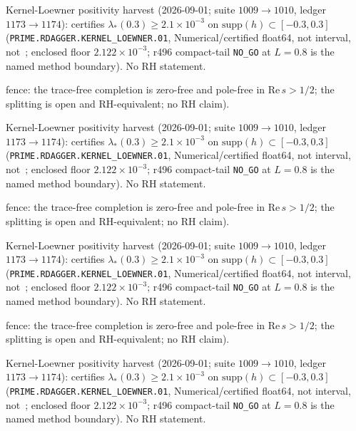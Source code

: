 
Kernel-Loewner positivity harvest (2026-09-01; suite $1009\to1010$, ledger $1173\to1174$):
certifies $\lambda_*(0.3)\ge 2.1{\times}10^{-3}$ on $\mathrm{supp}(h)\subset[-0.3,0.3]$
(\texttt{PRIME.RDAGGER.KERNEL\_LOEWNER.01}, Numerical/certified float64, not interval, not~\mE; enclosed floor $2.122{\times}10^{-3}$;
r496 compact-tail \texttt{NO\_GO} at $L=0.8$ is the named method boundary).  No RH statement.


fence: the trace-free completion is zero-free and pole-free in $\mathrm{Re}\,s>1/2$; the splitting is open and RH-equivalent; no RH claim).

Kernel-Loewner positivity harvest (2026-09-01; suite $1009\to1010$, ledger $1173\to1174$):
certifies $\lambda_*(0.3)\ge 2.1{\times}10^{-3}$ on $\mathrm{supp}(h)\subset[-0.3,0.3]$
(\texttt{PRIME.RDAGGER.KERNEL\_LOEWNER.01}, Numerical/certified float64, not interval, not~\mE; enclosed floor $2.122{\times}10^{-3}$;
r496 compact-tail \texttt{NO\_GO} at $L=0.8$ is the named method boundary).  No RH statement.


fence: the trace-free completion is zero-free and pole-free in $\mathrm{Re}\,s>1/2$; the splitting is open and RH-equivalent; no RH claim).

Kernel-Loewner positivity harvest (2026-09-01; suite $1009\to1010$, ledger $1173\to1174$):
certifies $\lambda_*(0.3)\ge 2.1{\times}10^{-3}$ on $\mathrm{supp}(h)\subset[-0.3,0.3]$
(\texttt{PRIME.RDAGGER.KERNEL\_LOEWNER.01}, Numerical/certified float64, not interval, not~\mE; enclosed floor $2.122{\times}10^{-3}$;
r496 compact-tail \texttt{NO\_GO} at $L=0.8$ is the named method boundary).  No RH statement.


fence: the trace-free completion is zero-free and pole-free in $\mathrm{Re}\,s>1/2$; the splitting is open and RH-equivalent; no RH claim).

Kernel-Loewner positivity harvest (2026-09-01; suite $1009\to1010$, ledger $1173\to1174$):
certifies $\lambda_*(0.3)\ge 2.1{\times}10^{-3}$ on $\mathrm{supp}(h)\subset[-0.3,0.3]$
(\texttt{PRIME.RDAGGER.KERNEL\_LOEWNER.01}, Numerical/certified float64, not interval, not~\mE; enclosed floor $2.122{\times}10^{-3}$;
r496 compact-tail \texttt{NO\_GO} at $L=0.8$ is the named method boundary).  No RH statement.


